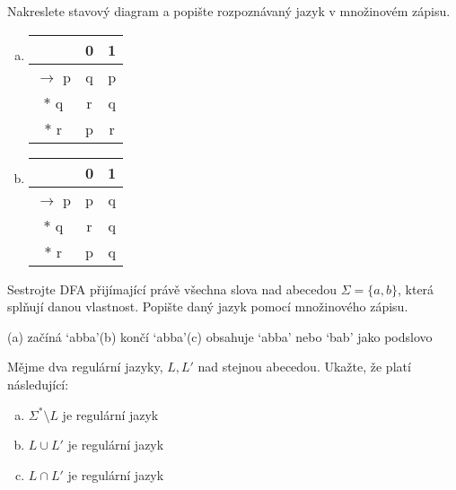 \documentclass[a4paper,12pt]{amsart}
\begin{document}
\medskip\begin{problem}

    Nakreslete stavový diagram a popište rozpoznávaný jazyk v množinovém zápisu.

    \begin{multicols}{2}
        
        \begin{enumerate}[(a)]

            \item \begin{tabular}{ c | c c }
            & 0 & 1 \\   \hline
            $\to$ p & q & p \\  
            $\ast$ q & r & q\\
            $\ast$ r & p & r
            \end{tabular}
    
        \columnbreak
    
            \item \begin{tabular}{ c | c c }
            & 0 & 1 \\   \hline
            $\to$ p & p & q \\  
            $\ast$ q & r & q\\
            $\ast$ r & p & q
            \end{tabular}

        \end{enumerate}

    \end{multicols}

\end{problem}


\medskip\begin{problem}

    Sestrojte DFA přijímající právě všechna slova nad abecedou $\Sigma=\{a,b\}$, která splňují danou vlastnost. Popište daný jazyk pomocí množinového zápisu.

    \medskip
    
    (a) začíná `abba'\hfill (b) končí `abba'\hfill (c) obsahuje `abba' nebo `bab' jako podslovo
\end{problem}


\medskip\begin{problem}

    Mějme dva regulární jazyky, $L,L'$ nad stejnou abecedou. Ukažte, že platí následující:
  
    \medskip
    
    \begin{enumerate}[(a)]\setlength\itemsep{6pt}
        \item $\Sigma^*\setminus L$ je regulární jazyk
        \item $L\cup L'$ je regulární jazyk
        \item $L\cap L'$ je regulární jazyk       
    \end{enumerate}
      
\end{problem}
\end{document}
